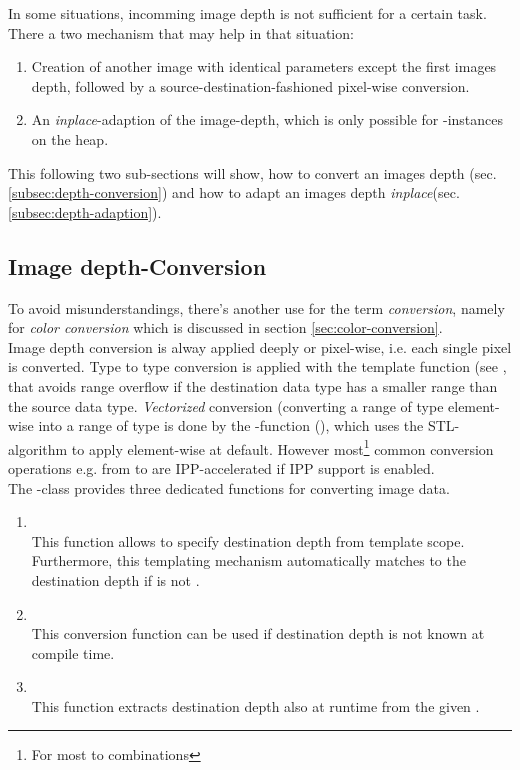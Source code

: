 In some situations, incomming image depth is not sufficient for a certain task. There a two mechanism that may help in that situation:
\begin{enumerate}
\item Creation of another image with identical parameters except the first images depth, followed by a source-destination-fashioned pixel-wise conversion.
\item An \emph{inplace}-adaption of the image-depth, which is only possible for -instances on the heap.
\end{enumerate}

This following two sub-sections   will show, how to convert an images depth (sec. \ref{subsec:depth-conversion}) and how to adapt an images depth \emph{inplace}(sec. \ref{subsec:depth-adaption}).

\subsection {\label{subsec:depth-conversion}Image depth-Conversion}
To avoid misunderstandings, there's another use for the term \emph{conversion}, namely for \emph{color conversion} which is discussed in section \ref{sec:color-conversion}.\\
Image depth conversion is alway applied deeply or pixel-wise, i.e. each single pixel is converted. Type to type conversion is applied with the  template function (see , that avoids range overflow if the destination data type has a smaller range than the source data type. \emph{Vectorized} conversion (converting a range of type  element-wise into a range of type  is done by the -function (), which uses the STL-algorithm  to apply  element-wise at default. However most\footnote{For most  to  combinations} common conversion operations e.g. from  to  are IPP-accelerated if IPP support is enabled.\\
The -class provides three dedicated  functions for converting image data. 
\begin{enumerate}
\item {}\\
This function allows to specify destination depth from template scope. Furthermore, this templating mechanism automatically matches to the destination depth if  is not .
\item {}\\
This conversion function can be used if destination depth is not known at compile time.
\item {}\\
This function extracts destination depth also at runtime from the given .      
\end{enumerate}


